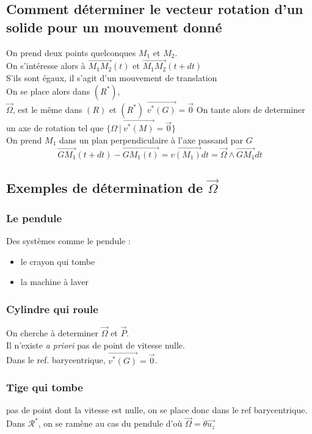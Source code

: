 \documentclass[../main.tex]{subfile}
\begin{document}
\subsection{Comment déterminer le vecteur rotation d'un solide pour un mouvement donné}
On prend deux points quelconques $M_1$ et $M_2$.\\
On s'intéresse alors à $\vec{M_1M_2}(t)$ et $\vec{M_1M_2}(t + dt)$\\
S'ils sont égaux, il s'agit d'un mouvement de translation\\






On se place alors dans $(R^*)$, \\
$\vec{\Omega}$, est le même dans $(R)$ et $(R^*)$
$\vec{v^*(G)} = \vec{0}$
On tante alors de determiner un axe de rotation tel que $\{\Omega \ | \ \vec{v^*(M)} = \vec{0}\}$\\
On prend $M_1$ dans un plan perpendiculaire à l'axe passand par $G$\\
$$\vec{GM_1}(t + dt) - \vec{GM_1(t)} = \vec{v(M_1)}dt = \vec{\Omega} \wedge \vec{GM_1} dt$$






\subsection{Exemples de détermination de $\vec{\Omega}$}
\subsubsection{Le pendule}

Des systèmes comme le pendule :
\begin{itemize}
	\item le crayon qui tombe
	\item la machine à laver
\end{itemize}
\subsubsection{Cylindre qui roule}
On cherche à determiner $\vec{\Omega}$ et $\vec{P}$.\\
Il n'existe \textit{a priori} pas de point de vitesse nulle.\\
Dans le ref. barycentrique, $\vec{v^*(G)} = \vec{0}$.

\subsubsection{Tige qui tombe}
pas de point dont la vitesse est nulle, on se place donc dans le ref barycentrique.\\
Dans $\mathcal{R}^*$, on se ramène au cas du pendule d'où $\vec{\Omega} = \dot{\theta} \vec{u_z}$
\end{document}
